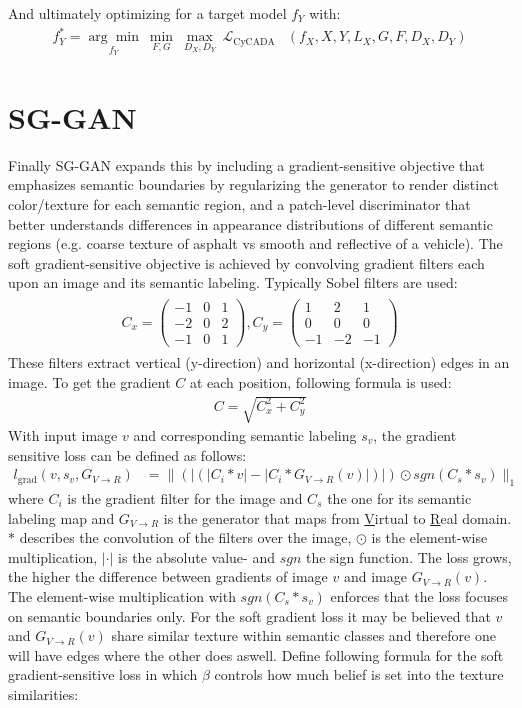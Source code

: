 And ultimately optimizing for a target model $f_Y$ with:
\begin{align}
	f^*_Y = \underset{f_Y}{\arg\min} ~ \underset{F,G}{\min} ~ \underset{D_X, D_Y}{\max} ~ \mathcal{L}_{\text{CyCADA}}&(f_X, X, Y, L_X, G, F, D_X, D_Y)
\end{align}
\section{SG-GAN}
Finally SG-GAN \cite{DBLP:journals/corr/abs-1801-01726} expands this by including a gradient-sensitive objective that emphasizes semantic boundaries by regularizing the generator to render distinct color/texture for each semantic region, and a patch-level discriminator that better understands differences in appearance distributions of different semantic regions (e.g. coarse texture of asphalt vs smooth and reflective of a vehicle). The soft gradient-sensitive objective is achieved by convolving gradient filters each upon an image and its semantic labeling. Typically Sobel filters are used:
\begin{align}
	\begin{array}{cc}
		C_x = 
		\begin{pmatrix}
			-1 & 0 & 1\\
			-2 & 0 & 2\\
			-1 & 0 & 1
		\end{pmatrix},
		C_y = 
		\begin{pmatrix}
			1 & 2 & 1\\
			0 & 0 & 0\\
			-1 & -2 & -1
		\end{pmatrix}
	\end{array}
\end{align}
These filters extract vertical (y-direction) and horizontal (x-direction) edges in an image. To get the gradient $C$ at each position, following formula is used:
\begin{align}
	C = \sqrt{C_x^2 + C_y^2}
\end{align}
With input image $v$ and corresponding semantic labeling $s_v$, the gradient sensitive loss can be defined as follows:
\begin{align}
		l_{\text{grad}}(v,s_v,G_{V\rightarrow R}) &= \lVert(|(|C_i * v |-|C_i*G_{V\rightarrow R}(v)|)|) \odot sgn(C_s*s_v)\rVert_1
\end{align}
where $C_i$ is the gradient filter for the image and $C_s$ the one for its semantic labeling map and $G_{V\rightarrow R}$ is the generator that maps from \underline{V}irtual to \underline{R}eal domain. $*$ describes the convolution of the filters over the image, $\odot$ is the element-wise multiplication, $|\cdot|$ is the absolute value- and $sgn$ the sign function. The loss grows, the higher the difference between gradients of image $v$ and image $G_{V\rightarrow R}(v)$. The element-wise multiplication with $sgn(C_s * s_v)$ enforces that the loss focuses on semantic boundaries only. For the soft gradient loss it may be believed that $v$ and $G_{V\rightarrow R}(v)$ share similar texture within semantic classes and therefore one will have edges where the other does aswell. Define following formula for the soft gradient-sensitive loss in which $\beta$ controls how much belief is set into the texture similarities:
